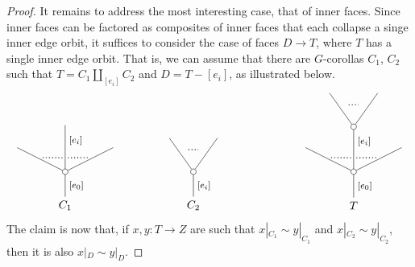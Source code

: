 \documentclass[a4paper,10pt
,draft
]{article}%
\numberwithin{equation}{section}
\numberwithin{figure}{section}
\theoremstyle{definition} %
\newcommand{\1}{\ensuremath{\mathbbm 1}}%
\begin{document}
\begin{proof}
It remains to address the most interesting case,
that of inner faces. Since inner faces can be factored as composites of inner faces that each collapse a singe inner edge orbit,
it suffices to consider the case of faces $D \to T$,
where $T$ has a single inner edge orbit.
That is, we can assume that there are $G$-corollas
$C_1$, $C_2$ such that 
$T = C_1 \amalg_{[e_i]} C_2$ and
$D = T - [e_i]$, as illustrated below.
\[
\begin{tikzpicture}
[grow=up,auto,level distance=3em,
every node/.style = {font=\footnotesize},
dummy/.style={circle,draw,inner sep=0pt,minimum size=1.75mm}]
	\node at (0,0) [font=\normalsize]{$C_1$}
		child{node [dummy] {}
			child[level distance=2.15em]{
			edge from parent node [swap,near end] {} node [inner sep=1pt,name=Kn] {}}
			child[level distance=4.5em]{node {}
			edge from parent node [pos=0.65,swap] {$[e_i]$}
node [near start,inner sep=1pt,name=Kone,swap] {}
node [near start,inner sep=1pt,name=Kone1] {}}
			child[level distance=2.15em]{
			edge from parent node [near end] {}
node [swap] {}
node [inner sep=1pt,name=Kn1,swap]{}}
		edge from parent node [swap] {$[e_0]$}
		};
		\draw [dotted,thick] (Kone) -- (Kn) ;
		\draw [dotted,thick] (Kone1) -- (Kn1) ;
	\node at (4,0) [font=\normalsize]{$C_2$}
		child{node [dummy] {}
			child{
			edge from parent node [swap,near end] {} node [name=Kn] {}}
			child{
			edge from parent node [near end] {}
node [name=Kone,swap] {}}
		edge from parent node [swap] {$[e_i]$}
		};
		\draw [dotted,thick] (Kone) -- (Kn) ;
	\node at (9,0) [font=\normalsize]{$T$}
		child{node [dummy] {}
			child[level distance=2.15em]{
			edge from parent node [swap,near end] {} node [inner sep=1pt,name=Kn] {}}
			child[level distance=4em]{node [dummy] {}
				child[level distance=3em]{
				edge from parent node [swap,near end] {} node [name=Kn2] {}}
				child[level distance=3em]{
				edge from parent node [near end] {}
node [name=Kone2,swap] {}}
			edge from parent node [pos=0.7,swap] {$[e_i]$}
node [pos=0.28,inner sep=1pt,name=Kone,swap] {}
node [pos=0.28,inner sep=1pt,name=Kone1] {}}
			child[level distance=2.15em]{
			edge from parent node [near end] {}
node [swap] {}
node [inner sep=1pt,name=Kn1,swap]{}}
		edge from parent node [swap] {$[e_0]$}
		};
		\draw [dotted,thick] (Kone) -- (Kn) ;
		\draw [dotted,thick] (Kone1) -- (Kn1) ;
		\draw [dotted,thick] (Kone2) -- (Kn2) ;
\end{tikzpicture}
\]
The claim is now that,
if $x,y \colon T \to Z$ are such that
$x|_{C_1} \sim y|_{C_1}$ and
$x|_{C_2} \sim y|_{C_2}$,
then it is also 
$x|_{D} \sim y|_{D}$.

\end{proof}
\end{document}
